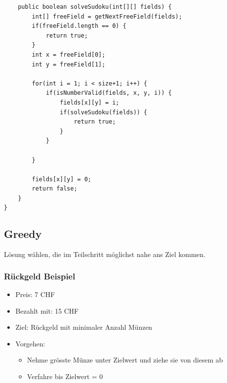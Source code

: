 \begin{multicols*}{4}
\begin{lstlisting}
	public boolean solveSudoku(int[][] fields) { 
		int[] freeField = getNextFreeField(fields); 
		if(freeField.length == 0) { 
			return true; 
		} 
		int x = freeField[0]; 
		int y = freeField[1]; 
		
		for(int i = 1; i < size+1; i++) { 
			if(isNumberValid(fields, x, y, i)) { 
				fields[x][y] = i; 
				if(solveSudoku(fields)) { 
					return true; 
				} 
			} 
			
		} 

		fields[x][y] = 0; 
		return false; 
	} 
} 
			\end{lstlisting}


\columnbreak

	\subsection{Greedy}
	Lösung wählen, die im Teilschritt möglichst nahe ans Ziel kommen.
	
	\subsubsection{Rückgeld Beispiel}
	\begin{itemize}
		\item Preis: 7 CHF
		\item Bezahlt mit: 15 CHF
		\item Ziel: Rückgeld mit minimaler Anzahl Münzen
		\item Vorgehen:
		\begin{itemize}
			\item Nehme grösste Münze unter Zielwert und ziehe sie von diesem ab
			\item Verfahre bis Zielwert = 0
		\end{itemize}
	\end{itemize}


\end{multicols*}
